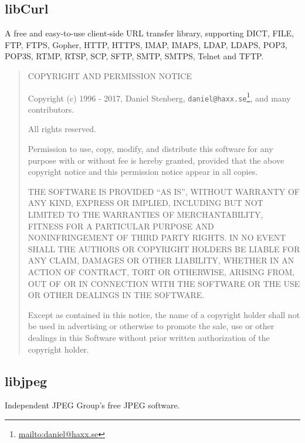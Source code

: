 \documentclass[
]{book}
\DeclareRobustCommand{\href}[2]{#2\footnote{\url{#1}}}
\theoremstyle{definition}
\theoremstyle{definition}
\theoremstyle{definition}
\theoremstyle{definition}
\theoremstyle{remark}
\begin{document}
\hypertarget{libcurl}{%
\subsection*{libCurl}\label{libcurl}}

A free and easy-to-use client-side URL transfer library, supporting DICT, FILE, FTP, FTPS, Gopher, HTTP, HTTPS, IMAP, IMAPS, LDAP, LDAPS, POP3, POP3S, RTMP, RTSP, SCP, SFTP, SMTP, SMTPS, Telnet and TFTP.

\begin{quote}
COPYRIGHT AND PERMISSION NOTICE

Copyright (c) 1996 - 2017, Daniel Stenberg, \href{mailto:daniel@haxx.se}{\nolinkurl{daniel@haxx.se}}, and many contributors.

All rights reserved.

Permission to use, copy, modify, and distribute this software for any purpose
with or without fee is hereby granted, provided that the above copyright
notice and this permission notice appear in all copies.

THE SOFTWARE IS PROVIDED ``AS IS'', WITHOUT WARRANTY OF ANY KIND, EXPRESS OR IMPLIED,
INCLUDING BUT NOT LIMITED TO THE WARRANTIES OF MERCHANTABILITY, FITNESS FOR A
PARTICULAR PURPOSE AND NONINFRINGEMENT OF THIRD PARTY RIGHTS. IN NO EVENT SHALL
THE AUTHORS OR COPYRIGHT HOLDERS BE LIABLE FOR ANY CLAIM, DAMAGES OR OTHER LIABILITY,
WHETHER IN AN ACTION OF CONTRACT, TORT OR OTHERWISE, ARISING FROM, OUT OF OR IN
CONNECTION WITH THE SOFTWARE OR THE USE OR OTHER DEALINGS IN THE SOFTWARE.

Except as contained in this notice, the name of a copyright holder shall not
be used in advertising or otherwise to promote the sale, use or other dealings
in this Software without prior written authorization of the copyright holder.
\end{quote}

\hypertarget{libjpeg}{%
\subsection*{libjpeg}\label{libjpeg}}

Independent JPEG Group's free JPEG software.
\end{document}
